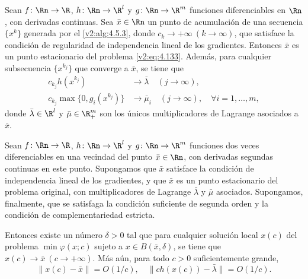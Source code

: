 \begin{theorem}\label{v2:thm:4.5.4}
Sean $f \colon \Rn \to \R$, $h \colon \Rn \to \R^l$ y $g \colon \Rn \to \R^m$ funciones diferenciables en $\Rn$, con derivadas continuas. Sea $\bar{x} \in \Rn$ un punto de acumulación de una secuencia $\{x^k\}$ generada por el \cref{v2:alg:4.5.3}, donde $c_k \to +\infty \ (k \to \infty)$, que satisface la condición de regularidad de independencia lineal de los gradientes. Entonces $\bar{x}$ es un punto estacionario del problema \eqref{v2:eq:4.133}. Además, para cualquier subsecuencia $\{x^{k_j}\}$ que converge a $\bar{x}$, se tiene que
\begin{align}
    c_{k_j} h(x^{k_j}) &\to \bar{\lambda} \quad (j \to \infty), \label{v2:eq:4.202} \\
    c_{k_j} \max\{0, g_i(x^{k_j})\} &\to \bar{\mu}_i \quad (j \to \infty), \quad \forall i = 1, \dots, m, \label{v2:eq:4.203}
\end{align}
donde $\bar{\lambda} \in \R^l$ y $\bar{\mu} \in \R^m_+$ son los únicos multiplicadores de Lagrange asociados a $\bar{x}$.
\end{theorem}

\begin{theorem}\label{v2:thm:4.5.5}
Sean $f \colon \Rn \to \R$, $h \colon \Rn \to \R^l$ y $g \colon \Rn \to \R^m$ funciones dos veces diferenciables en una vecindad del punto $\bar{x} \in \Rn$, con derivadas segundas continuas en este punto. Supongamos que $\bar{x}$ satisface la condición de independencia lineal de los gradientes, y que $\bar{x}$ es un punto estacionario del problema original, con multiplicadores de Lagrange $\bar{\lambda}$ y $\bar{\mu}$ asociados. Supongamos, finalmente, que se satisfaga la condición suficiente de segunda orden y la condición de complementariedad estricta.

Entonces existe un número $\delta > 0$ tal que para cualquier solución local $x(c)$ del problema $\min \varphi(x; c)$ sujeto a $x \in B(\bar{x}, \delta)$, se tiene que $x(c) \to \bar{x} \ (c \to +\infty)$. Más aún, para todo $c > 0$ suficientemente grande,
\begin{equation}
    \|x(c) - \bar{x}\| = O(1/c), \quad \|c h(x(c)) - \bar{\lambda}\| = O(1/c). \label{v2:eq:4.205}
\end{equation}
\end{theorem}

